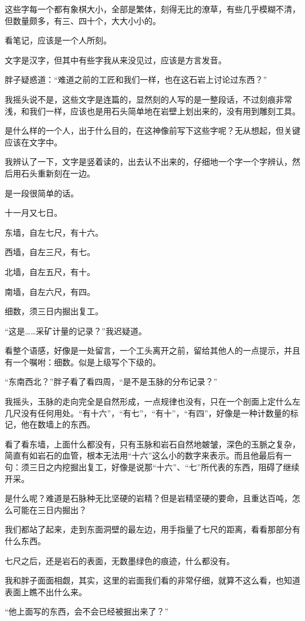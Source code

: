 这些字每一个都有象棋大小，全部是繁体，刻得无比的潦草，有些几乎模糊不清，但数量颇多，有三、四十个，大大小小的。

看笔记，应该是一个人所刻。

文字是汉字，但其中有些字我从来没见过，应该是方言发音。

胖子疑惑道：“难道之前的工匠和我们一样，也在这石岩上讨论过东西？”

我摇头说不是，这些文字是连篇的，显然刻的人写的是一整段话，不过刻痕非常浅，和我们一样，应该也是用石头简单地在岩壁上划出来的，没有用到雕刻工具。

是什么样的一个人，出于什么目的，在这神像前写下这些字呢？无从想起，但关键应该在文字中。

我辨认了一下，文字是竖着读的，出去认不出来的，仔细地一个字一个字辨认，然后用石头重新刻在一边。

是一段很简单的话。

十一月又七日。

东墙，自左七尺，有十六。

西墙，自左三尺，有七。

北墙，自左五尺，有十。

南墙，自左六尺，有四。

细数，须三日内掘出复工。

“这是……采矿计量的记录？”我迟疑道。

看整个语感，好像是一处留言，一个工头离开之前，留给其他人的一点提示，并且有一个嘱咐：细数。似是上级写个下级的。

“东南西北？”胖子看了看四周，“是不是玉脉的分布记录？”

我摇头，玉脉的走向完全是自然形成，一点规律也没有，只在一个剖面上定什么左几尺没有任何用处。“有十六”，“有七”，“有十”，“有四”，好像是一种计数量的标记，他在数墙上的东西。

看了看东墙，上面什么都没有，只有玉脉和岩石自然地皴皱，深色的玉脈之复杂，简直有如岩石的血管，根本无法用“十六”这么小的数字来表示。而且他最后有一句：须三日之内挖掘出复工，好像是说那“十六”、“七”所代表的东西，阻碍了继续开采。

是什么呢？难道是石脉种无比坚硬的岩精？但是岩精坚硬的要命，且重达百吨，怎么可能在三日内掘出？

我们都站了起来，走到东面洞壁的最左边，用手指量了七尺的距离，看看那部分有什么东西。

七尺之后，还是岩石的表面，无数墨绿色的痕迹，什么都没有。

我和胖子面面相觑，其实，这里的岩面我们看的非常仔细，就算不这么看，也知道表面上瞧不出什么来。

“他上面写的东西，会不会已经被掘出来了？”

